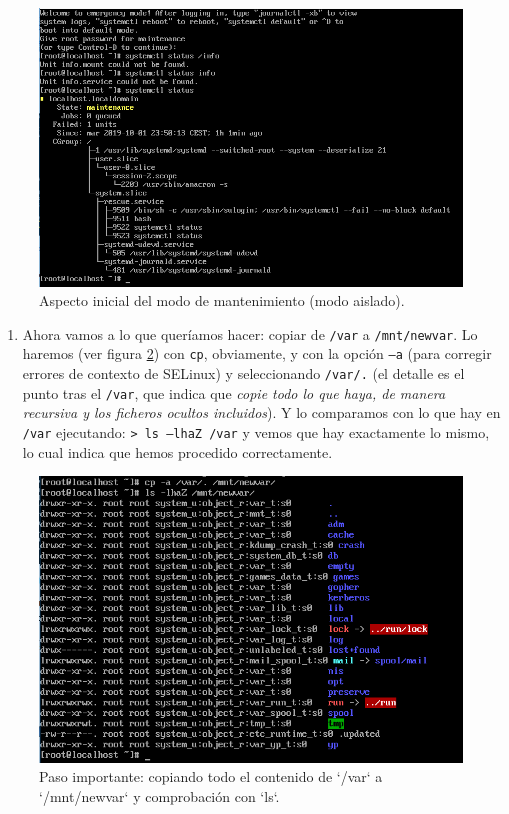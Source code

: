 \documentclass[
]{memoir}
\providecommand{\tightlist}{%
  \setlength{\itemsep}{0pt}\setlength{\parskip}{0pt}}
\begin{document}
\begin{figure}

{\centering \includegraphics[width=0.8\linewidth]{images/i} 

}

\caption{Aspecto inicial del modo de mantenimiento (modo aislado).}\label{fig:i}
\end{figure}

\begin{enumerate}
\def\labelenumi{\arabic{enumi}.}
\setcounter{enumi}{10}
\tightlist
\item
  Ahora vamos a lo que queríamos hacer: copiar de \texttt{/var} a \texttt{/mnt/newvar}. Lo haremos (ver figura \ref{fig:j}) con \texttt{cp}, obviamente, y con la opción \texttt{–a} (para corregir errores de contexto de SELinux) y seleccionando \texttt{/var/.} (el detalle es el punto tras el \texttt{/var}, que indica que \emph{copie todo lo que haya, de manera recursiva y los ficheros ocultos incluidos}). Y lo comparamos con lo que hay en \texttt{/var} ejecutando: \texttt{\textgreater{}\ ls\ –lhaZ\ /var} y vemos que hay exactamente lo mismo, lo cual indica que hemos procedido correctamente.
\end{enumerate}

\begin{figure}

{\centering \includegraphics[width=0.75\linewidth]{images/j} 

}

\caption{Paso importante: copiando todo el contenido de `/var` a `/mnt/newvar` y comprobación con `ls`.}\label{fig:j}
\end{figure}
\end{document}
